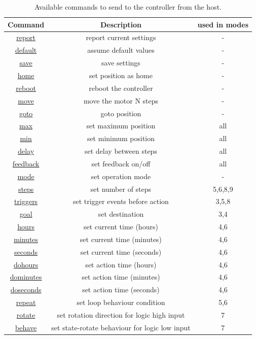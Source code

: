 \documentclass[10pt]{article}
\begin{document}
\begin{table}[!hb]
\centering
\begin{tabular}{|c|c|c|}
\hline
Command & 
Description & 
used in modes 
\\
\hline
\hyperref[report]{report} & 
report current settings &
-
\\ \hline
\hyperref[default]{default} & 
assume default values &
-
\\ \hline
\hyperref[save]{save} & 
save settings &
-
\\ \hline
\hyperref[home]{home} & 
set position as home &
-
\\ \hline
\hyperref[reboot]{reboot} & 
reboot the controller &
-
\\ \hline
\hyperref[move]{move} & 
move the motor N steps &
-
\\ \hline
\hyperref[goto]{goto} & 
goto position &
-
\\ \hline
\hyperref[max]{max} & 
set maximum position &
all
\\ \hline
\hyperref[min]{min} & 
set minimum position &
all
\\ \hline
\hyperref[delay]{delay} & 
set delay between steps &
all
\\ \hline
\hyperref[feedback]{feedback} & 
set feedback on/off &
all
\\ \hline
\hyperref[mode]{mode} & 
set operation mode &
-
\\ \hline
\hyperref[steps]{steps} & 
set number of steps &
5,6,8,9
\\ \hline
\hyperref[triggers]{triggers} & 
set trigger events before action&
3,5,8
\\ \hline
\hyperref[goal]{goal} & 
set destination &
3,4
\\ \hline
\hyperref[hours]{hours} & 
set current time (hours) &
4,6
\\ \hline
\hyperref[minutes]{minutes} & 
set current time (minutes) &
4,6
\\ \hline
\hyperref[seconds]{seconds} & 
set current time (seconds) &
4,6
\\ \hline
\hyperref[dohours]{dohours} & 
set action time (hours) &
4,6
\\ \hline
\hyperref[dominutes]{dominutes} & 
set action time (minutes) &
4,6
\\ \hline
\hyperref[doseconds]{doseconds} & 
set action time (seconds) &
4,6
\\ \hline
\hyperref[repeat]{repeat} & 
set loop behaviour condition &
5,6
\\ \hline
\hyperref[rotate]{rotate} & 
set rotation direction for logic high input &
7
\\ \hline
\hyperref[behave]{behave} & 
set state-rotate behaviour for logic low input &
7
\\ \hline
\end{tabular}
\caption{Available commands to send to the controller from the host.}
\label{commands}
\end{table} 
\end{document}

